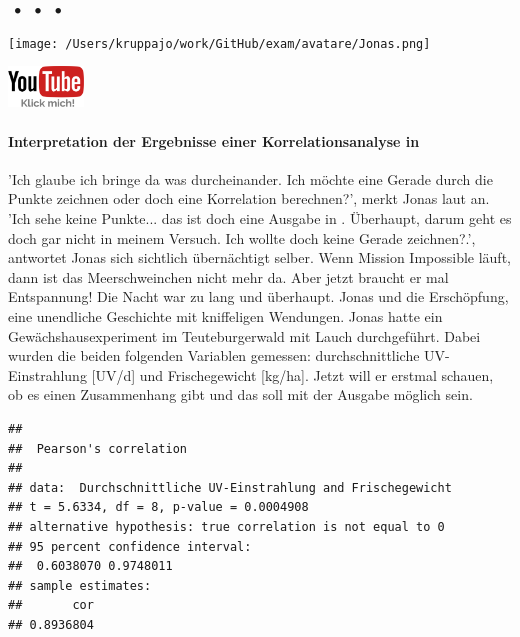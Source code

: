 \documentclass[a4paper, 9pt]{scrartcl}\usepackage[]{graphicx}\usepackage[]{xcolor}
\makeatletter
\newenvironment{kframe}{%
 \def\at@end@of@kframe{}%
 \ifinner\ifhmode%
  \def\at@end@of@kframe{\end{minipage}}%
  \begin{minipage}{\columnwidth}%
 \fi\fi%
 \def\FrameCommand##1{\hskip\@totalleftmargin \hskip-\fboxsep
 \colorbox{shadecolor}{##1}\hskip-\fboxsep
     \hskip-\linewidth \hskip-\@totalleftmargin \hskip\columnwidth}%
 \MakeFramed {\advance\hsize-\width
   \@totalleftmargin\z@ \linewidth\hsize
   \@setminipage}}%
 {\par\unskip\endMakeFramed%
 \at@end@of@kframe}
\newenvironment{knitrout}{}{} %
\makeatother
\begin{document}
 
\ifcollection
\begin{flushright}
\tiny\vspace{-3Ex}
\textbf{\examinhaltstart}
\exammodulestat $\;\bullet$
\exammodulestatbbv $\;\bullet$
\exammodulestatversuch $\;\bullet$
\exammodulebiostat
\vspace{-4Ex}
\end{flushright}
\begin{minipage}[t]{0.5\textwidth}
\texttt{[image: /Users/kruppajo/work/GitHub/exam/avatare/Jonas.png]}
\end{minipage}
\begin{minipage}[t]{0.5\textwidth}
\hfill
\href{https://youtu.be/C9skfFRTHhI}{\includegraphics[width = 2cm]{img/youtube}}
\end{minipage}
\vspace{-3ex}
\fi



\ifcollection
\paragraph{Interpretation der Ergebnisse einer Korrelationsanalyse in \Rlogo}
\fi

'Ich glaube ich bringe da was durcheinander. Ich möchte eine Gerade durch die Punkte zeichnen oder doch eine Korrelation berechnen?', merkt Jonas laut an. 'Ich sehe keine Punkte... das ist doch eine Ausgabe in \Rlogo. Überhaupt, darum geht es doch gar nicht in meinem Versuch. Ich wollte doch keine Gerade zeichnen?.', antwortet Jonas sich sichtlich übernächtigt selber. Wenn Mission Impossible läuft, dann ist das Meerschweinchen nicht mehr da. Aber jetzt braucht er mal Entspannung! Die Nacht war zu lang und überhaupt. Jonas und die Erschöpfung, eine unendliche Geschichte mit kniffeligen Wendungen. Jonas hatte ein Gewächshausexperiment im Teuteburgerwald mit Lauch durchgeführt. Dabei wurden die beiden folgenden Variablen gemessen: durchschnittliche UV-Einstrahlung [UV/d] und Frischegewicht [kg/ha]. Jetzt will er erstmal schauen, ob es einen Zusammenhang gibt und das soll mit der \Rlogo Ausgabe möglich sein.


\begin{knitrout}
\color{fgcolor}\begin{kframe}
\begin{verbatim}
## 
## 	Pearson's correlation
## 
## data:  Durchschnittliche UV-Einstrahlung and Frischegewicht
## t = 5.6334, df = 8, p-value = 0.0004908
## alternative hypothesis: true correlation is not equal to 0
## 95 percent confidence interval:
##  0.6038070 0.9748011
## sample estimates:
##       cor 
## 0.8936804
\end{verbatim}
\end{kframe}
\end{knitrout}
\end{document}
